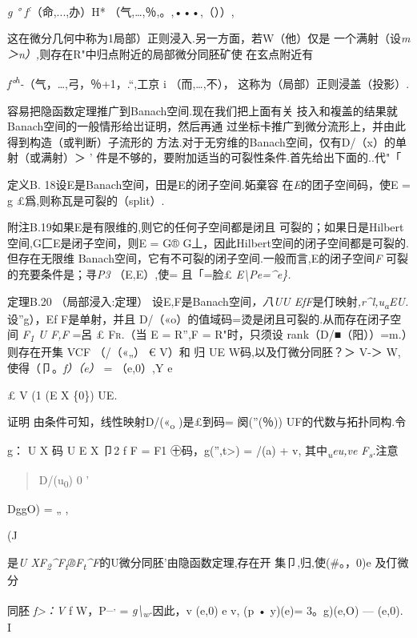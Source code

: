 \documentclass{article}
\begin{document}
\emph{g ° f\textsuperscript{:}}（命,...,办）H*
（气,\ldots{},％,。,•••,（））,

这在微分几何中称为1局部）正则浸入.另一方面，若W（他）仅是
一个满射（设\emph{m＞n）,}则存在R"中归点附近的局部微分同胚矿使
在玄点附近有

\emph{f°\textsuperscript{h}-}（气，\ldots{},弓，％+1，.``,工京 i
（而,\ldots{},不）， 这称为（局部）正则浸盖（投影）.

容易把隐函数定理推广到Banach空间.现在我们把上面有关
技入和複盖的结果就Banach空间的一般情形给岀证明，然后再通
过坐标卡推广到微分流形上，并由此得到构造（或判断）子流形的
方法.对于无穷维的Banach空间，仅有D/（x）的单射（或满射）＞ '
件是不够的，要附加适当的可裂性条件.首先给出下面的..代"「

定义B. 18设E是Banach空间，田是E的闭子空间.妬棄容
在\emph{E}的团子空间码，使E = g £爲,则称瓦是可裂的（split）.

附注B.19如果E是有限维的,则它的任何子空间都是闭且
可裂的；如果日是Hilbert空间,G匚E是闭子空间，则E = G®
G丄，因此Hilbert空间的闭子空间都是可裂的.但存在无限维
Banach空间，它有不可裂的闭子空间.一般而言,E的闭子空间\emph{F}
可裂的充要条件是；寻\emph{P3} （E,E）,使= 且「=脸£
\emph{E\textbackslash{}Pe=\^{}e\}.}

定理B.20 （局部浸入:定理） 设E,F是Banach空间\emph{，八UU
EfF}是仃映射\emph{,r\^{}l,u\textsubscript{a}EU.}设''g），Ef
F是单射，并且 D/（«o）的值域码=烫是闭且可裂的.从而存在闭子空 间
\emph{F\textsubscript{1} U F,F} =呂 £ \textsc{Fr.}（当 E = R'',F =
R"时，只须设 rank（D/■（阳））=m.）则存在开集 VCF （/（«„） € V）和 归
UE W码,以及仃微分同胚？＞ V-＞ W,使得（卩。\emph{f）（e）} = （e,0）,Y e

£ V (1 (E X \{0\}) UE.

证明 由条件可知，线性映射D/(«\textsubscript{o} )是£到码= 阕(''(％))
UF的代数与拓扑同构.令

g： U X 码 U E X 卩2 f F = F1 ㊉码，g('',t\textgreater{}) = /(a) + v,
其中\emph{\textsubscript{u}eu,ve F\textsubscript{s}.}注意

\begin{quote}
D/(u\textsubscript{0}) 0 '
\end{quote}

DggO) = „ ,

(J

是\emph{U
XF\textsubscript{2}\^{}F\textsubscript{t}®F\textsubscript{t}\^{}F}的U微分同胚'由隐函数定理,存在开
集卩,归,使(\#。，0)e 及仃微分

同胚 \emph{f\textgreater{}：V} f W，P\textsuperscript{\_,} =
\emph{g\textbackslash{}\textsubscript{w}.}因此，v (e,0) e v, (p • y)(e)=
3。g)(e,O) --- (e,0). I
\end{document}
